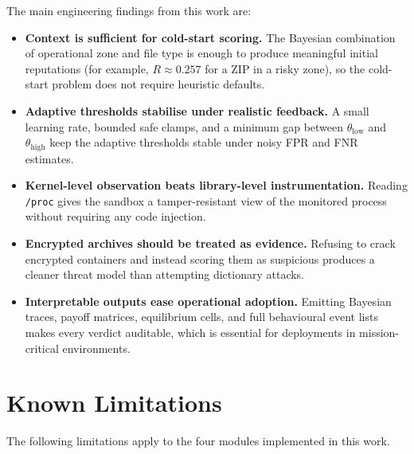 \documentclass[12pt, a4paper]{report}
\begin{document}
The main engineering findings from this work are:
\begin{itemize}
    \item \textbf{Context is sufficient for cold-start scoring.} The
          Bayesian combination of operational zone and file type is
          enough to produce meaningful initial reputations (for
          example, $R \approx 0.257$ for a ZIP in a risky zone), so
          the cold-start problem does not require heuristic defaults.
    \item \textbf{Adaptive thresholds stabilise under realistic
          feedback.} A small learning rate, bounded safe clamps, and
          a minimum gap between $\theta_{\text{low}}$ and
          $\theta_{\text{high}}$ keep the adaptive thresholds stable
          under noisy FPR and FNR estimates.
    \item \textbf{Kernel-level observation beats library-level
          instrumentation.} Reading \texttt{/proc} gives the sandbox a
          tamper-resistant view of the monitored process without
          requiring any code injection.
    \item \textbf{Encrypted archives should be treated as evidence.}
          Refusing to crack encrypted containers and instead scoring
          them as suspicious produces a cleaner threat model than
          attempting dictionary attacks.
    \item \textbf{Interpretable outputs ease operational adoption.}
          Emitting Bayesian traces, payoff matrices, equilibrium
          cells, and full behavioural event lists makes every verdict
          auditable, which is essential for deployments in
          mission-critical environments.
\end{itemize}

\section{Known Limitations}

The following limitations apply to the four modules implemented in
this work.
\end{document}
